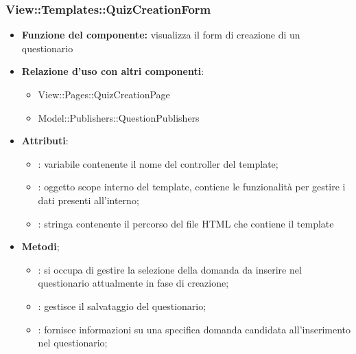  \subsubsection{View::Templates::QuizCreationForm}
 \begin{itemize}
 \item\textbf{Funzione del componente:} visualizza il form di creazione di un questionario
 \item\textbf{Relazione d'uso con altri componenti}:
 \begin{itemize}
 	\item View::Pages::QuizCreationPage
 	\item Model::Publishers::QuestionPublishers
 \end{itemize}
 \item\textbf{Attributi}:
 	\begin{itemize}
 		\item{}: variabile contenente il nome del controller del template;\\
		\item{}: oggetto scope interno del template, contiene le funzionalità per gestire i dati presenti all’interno;\\
		\item{}: stringa contenente il percorso del file HTML che contiene il template\\
 	\end{itemize}
 	\item\textbf{Metodi};
 	\begin{itemize}
 		\item{}: si occupa di gestire la selezione della domanda da inserire nel questionario attualmente in fase di creazione;\\
 		\item{}:
 		gestisce il salvataggio del questionario;\\
 		\item{}: fornisce informazioni su una specifica domanda candidata all'inserimento nel questionario;\\
 	\end{itemize}
 \end{itemize}
 
